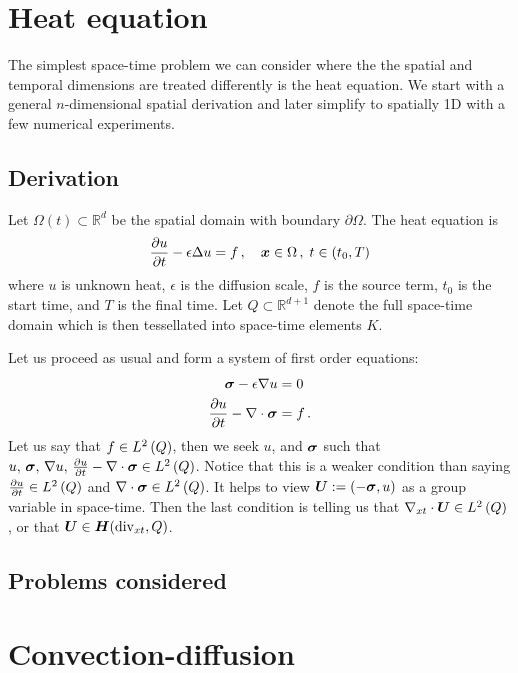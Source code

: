 \documentclass[Proposal.tex]{subfiles}
\begin{document}
\section{Heat equation}
The simplest space-time problem we can consider where the the spatial and temporal dimensions are treated differently is the heat equation.
We start with a general $n$-dimensional spatial derivation and later simplify to spatially 1D with a few numerical experiments.

\subsection{Derivation}
Let $\Omega(t)\subset\mathbb{R}^d$ be the spatial domain with boundary $\partial\Omega$.
The heat equation is
\begin{equation}
	\frac{\partial u}{\partial t}-\epsilon\Delta u=f\,,\quad\boldsymbol x\in\Omega\,,\;t\in(t_0,T)
\end{equation}
where $u$ is unknown heat, $\epsilon$ is the diffusion scale, $f$ is the source term, $t_0$ is the start time, and $T$ is the final time.
Let $Q\subset\mathbb{R}^{d+1}$ denote the full space-time domain which is then tessellated into space-time elements $K$.

Let us proceed as usual and form a system of first order equations:
\begin{equation}
\begin{aligned}
\boldsymbol\sigma-\epsilon\nabla u&=0\\
\frac{\partial u}{\partial t}-\nabla\cdot\boldsymbol\sigma&=f\,.
\end{aligned}
\end{equation}
Let us say that $f\in L^2\left( Q \right)$, then we seek $u$, and $\boldsymbol\sigma$ such that $u,\,\boldsymbol\sigma,\,\nabla u,\,\frac{\partial u}{\partial t}-\nabla\cdot\boldsymbol\sigma\in L^2\left( Q \right)$.
Notice that this is a weaker condition than saying $\frac{\partial u}{\partial t}\in L^2\left( Q \right)$ and $\nabla\cdot\boldsymbol\sigma\in L^2\left( Q \right)$.
It helps to view $\boldsymbol U:=(-\boldsymbol\sigma, u)$ as a group variable in space-time. 
Then the last condition is telling us that $\nabla_{xt}\cdot\boldsymbol U\in L^2\left( Q \right)$, or that $\boldsymbol U\in\mbox{\boldmath $H$}(\text{div}_{xt},Q)$.

\subsection{Problems considered}


\section{Convection-diffusion}
\end{document}
